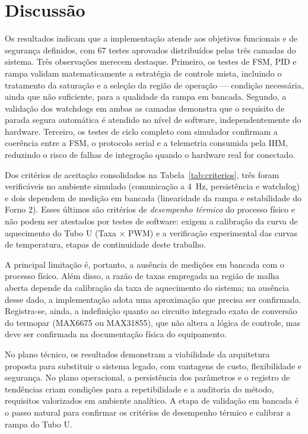 \section{Discuss\~ao}
\label{sec:disc}

Os resultados indicam que a implementa\c{c}\~ao atende aos objetivos funcionais e
de seguran\c{c}a definidos, com 67 testes aprovados distribu\'idos pelas tr\^es
camadas do sistema. Tr\^es observa\c{c}\~oes merecem destaque. Primeiro, os testes
de FSM, PID e rampa validam matematicamente a estrat\'egia de controle mista,
incluindo o tratamento da satura\c{c}\~ao e a sele\c{c}\~ao da regi\~ao de
opera\c{c}\~ao --- condi\c{c}\~ao necess\'aria, ainda que n\~ao suficiente, para a
qualidade da rampa em bancada. Segundo, a valida\c{c}\~ao dos watchdogs em ambas
as camadas demonstra que o requisito de parada segura autom\'atica \'e atendido no
n\'ivel de software, independentemente do hardware. Terceiro, os testes de ciclo
completo com simulador confirmam a coer\^encia entre a FSM, o protocolo serial e a
telemetria consumida pela IHM, reduzindo o risco de falhas de integra\c{c}\~ao
quando o hardware real for conectado.

Dos crit\'erios de aceita\c{c}\~ao consolidados na Tabela~\ref{tab:criterios},
tr\^es foram verific\'aveis no ambiente simulado (comunica\c{c}\~ao a 4~Hz,
persist\^encia e watchdog) e dois dependem de medi\c{c}\~ao em bancada
(linearidade da rampa e estabilidade do Forno 2). Esses \'ultimos s\~ao
crit\'erios de \emph{desempenho t\'ermico} do processo f\'isico e n\~ao podem ser
atestados por testes de software: exigem a calibra\c{c}\~ao da curva de
aquecimento do Tubo U (Taxa $\times$ PWM) e a verifica\c{c}\~ao experimental das
curvas de temperatura, etapas de continuidade deste trabalho.

A principal limita\c{c}\~ao \'e, portanto, a aus\^encia de medi\c{c}\~oes em
bancada com o processo f\'isico. Al\'em disso, a raz\~ao de taxas empregada na
regi\~ao de malha aberta depende da calibra\c{c}\~ao da taxa de aquecimento do
sistema; na aus\^encia desse dado, a implementa\c{c}\~ao adota uma aproxima\c{c}\~ao
que precisa ser confirmada. Registra-se, ainda, a indefini\c{c}\~ao quanto ao
circuito integrado exato de convers\~ao do termopar (MAX6675 ou MAX31855), que
n\~ao altera a l\'ogica de controle, mas deve ser confirmada na documenta\c{c}\~ao
f\'isica do equipamento.

No plano t\'ecnico, os resultados demonstram a viabilidade da arquitetura
proposta para substituir o sistema legado, com vantagens de custo, flexibilidade
e seguran\c{c}a. No plano operacional, a persist\^encia dos par\^ametros e o
registro de tend\^encias criam condi\c{c}\~oes para a repetibilidade e a auditoria
do m\'etodo, requisitos valorizados em ambiente anal\'itico. A etapa de
valida\c{c}\~ao em bancada \'e o passo natural para confirmar os crit\'erios de
desempenho t\'ermico e calibrar a rampa do Tubo U.
